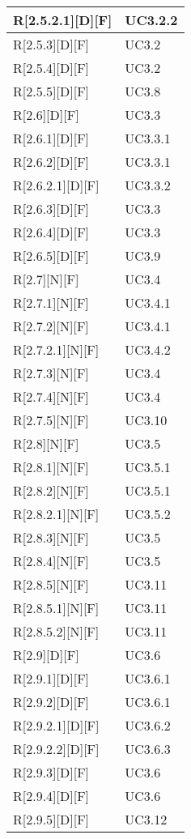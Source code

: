 \begin{longtable}{X | X}
\hline
R[2.5.2.1][D][F] & UC3.2.2 \\
\hline
R[2.5.3][D][F] & UC3.2 \\
\hline
R[2.5.4][D][F] & UC3.2 \\
\hline
R[2.5.5][D][F] & UC3.8 \\
\hline
R[2.6][D][F] & UC3.3 \\
\hline
R[2.6.1][D][F] & UC3.3.1 \\
\hline
R[2.6.2][D][F] & UC3.3.1 \\
\hline
R[2.6.2.1][D][F] & UC3.3.2 \\
\hline
R[2.6.3][D][F] & UC3.3 \\
\hline
R[2.6.4][D][F] & UC3.3 \\
\hline
R[2.6.5][D][F] & UC3.9 \\
\hline
R[2.7][N][F] & UC3.4 \\
\hline
R[2.7.1][N][F] & UC3.4.1 \\
\hline
R[2.7.2][N][F] & UC3.4.1 \\
\hline
R[2.7.2.1][N][F] & UC3.4.2 \\
\hline
R[2.7.3][N][F] & UC3.4 \\
\hline
R[2.7.4][N][F] & UC3.4 \\
\hline
R[2.7.5][N][F] & UC3.10 \\
\hline
R[2.8][N][F] & UC3.5 \\
\hline
R[2.8.1][N][F] & UC3.5.1 \\
\hline
R[2.8.2][N][F] & UC3.5.1 \\
\hline
R[2.8.2.1][N][F] & UC3.5.2 \\
\hline
R[2.8.3][N][F] & UC3.5 \\
\hline
R[2.8.4][N][F] & UC3.5 \\
\hline
R[2.8.5][N][F] & UC3.11 \\
\hline
R[2.8.5.1][N][F] & UC3.11 \\
\hline
R[2.8.5.2][N][F] & UC3.11 \\
\hline
R[2.9][D][F] & UC3.6 \\
\hline
R[2.9.1][D][F] & UC3.6.1 \\
\hline
R[2.9.2][D][F] & UC3.6.1 \\
\hline
R[2.9.2.1][D][F] & UC3.6.2 \\
\hline
R[2.9.2.2][D][F] & UC3.6.3 \\
\hline
R[2.9.3][D][F] & UC3.6 \\
\hline
R[2.9.4][D][F] & UC3.6 \\
\hline
R[2.9.5][D][F] & UC3.12 \\
\hline

\end{longtable}
